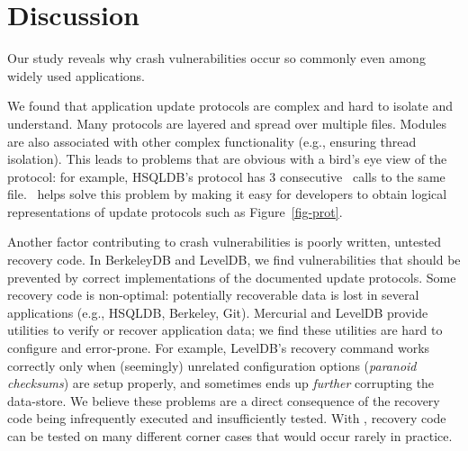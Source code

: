 \section{Discussion}
\label{sec-discussion}

Our study reveals why crash
vulnerabilities occur so commonly even among widely used applications.

We found that application update protocols are complex and hard to isolate and
understand. Many protocols are layered and spread over
multiple files. Modules are also associated with other
complex functionality (e.g., ensuring thread isolation). This leads to problems
that are obvious with a bird's eye view of the protocol:
for example, HSQLDB's protocol has 3 consecutive \fsyncSC\ calls to the
same file. \toolname\ helps solve this problem by making it easy for developers
to obtain logical representations of update protocols such as
Figure~\ref{fig-prot}. 

Another factor contributing to crash vulnerabilities is poorly written,
untested recovery code. In BerkeleyDB and LevelDB, we find vulnerabilities that
should be prevented by correct implementations of the documented update
protocols. Some recovery code is non-optimal: potentially recoverable data is
lost in several applications (e.g., HSQLDB, Berkeley, Git). Mercurial and
LevelDB provide utilities to verify or recover application data; we find these
utilities are hard to configure and error-prone. For example, LevelDB's
recovery command works correctly only when (seemingly) unrelated configuration
options (\textit{paranoid checksums}) are setup properly, and sometimes ends up
\textit{further} corrupting the data-store. We believe these problems are a
direct consequence of the recovery code being infrequently executed and
insufficiently tested. With \toolname, recovery code can be tested on many
different corner cases that would occur rarely in practice.    


